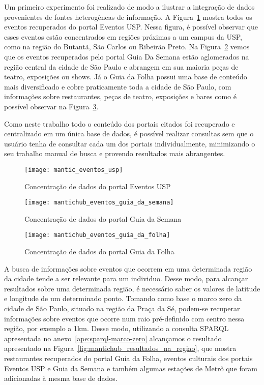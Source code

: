 Um primeiro experimento foi realizado de modo a ilustrar a integração de dados provenientes de fontes heterogêneas de informação. A Figura~\ref{fig:mantic_eventos_usp} mostra todos os eventos recuperados do portal Eventos USP. Nessa figura, é possível observar que esses eventos estão concentrados em regiões próximas a um campus da USP, como na região do Butantã, São Carlos ou Ribeirão Preto. Na Figura~\ref{fig:mantichub_eventos_guia_da_semana} vemos que os eventos recuperados pelo portal Guia Da Semana estão aglomerados na região central da cidade de São Paulo e abrangem em sua maioria peças de teatro, exposições ou shows. Já o Guia da Folha possui uma base de conteúdo mais diversificado e cobre praticamente toda a cidade de São Paulo, com informações sobre restaurantes, peças de teatro, exposições e bares como é possível observar na Figura~\ref{fig:mantichub_eventos_guia_da_folha}. 

Como neste trabalho todo o conteúdo dos portais citados foi recuperado e centralizado em um única base de dados, é possível realizar consultas  sem que o usuário tenha de consultar cada um dos portais individualmente, minimizando o seu trabalho manual de busca e provendo resultados mais abrangentes. 
 
\begin{figure}[!ht]
  \centering
  \texttt{[image: mantic\_eventos\_usp]} 
  \caption{Concentração de dados do portal Eventos USP}
  \label{fig:mantic_eventos_usp} 
\end{figure}

\begin{figure}[!ht]
  \centering
  \texttt{[image: mantichub\_eventos\_guia\_da\_semana]} 
  \caption{Concentração de dados do portal Guia da Semana}
  \label{fig:mantichub_eventos_guia_da_semana} 
\end{figure}

\begin{figure}[!ht]
  \centering
  \texttt{[image: mantichub\_eventos\_guia\_da\_folha]} 
  \caption{Concentração de dados do portal Guia da Folha}
  \label{fig:mantichub_eventos_guia_da_folha} 
\end{figure}

A busca de informações sobre eventos que ocorrem em uma determinada região da cidade tende a ser relevante para um individuo. Desse modo, para alcançar resultados sobre uma determinada região, é necessário saber os valores de latitude e longitude de um determinado ponto. Tomando como base o marco zero da cidade de São Paulo, situado na região da Praça da Sé, podem-se recuperar informações sobre eventos que ocorre num raio pré-definido com centro nessa região, por exemplo a 1km. Desse modo, utilizando a consulta SPARQL apresentada no anexo~\ref{ape:sparql-marco-zero} alcançamos o resultado apresentado na Figura~\ref{fig:mantichub_resultados_na_regiao}, que mostra restaurantes recuperados do portal Guia da Folha, eventos culturais dos portais Eventos USP e Guia da Semana e também algumas estações de Metrô que foram adicionadas à mesma base de dados.

